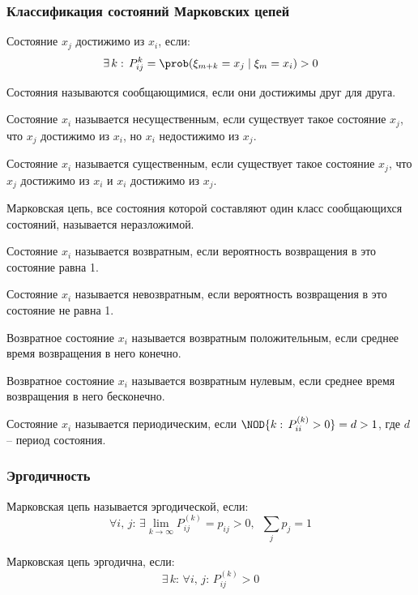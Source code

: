\documentclass[12pt]{article}
\begin{document}
\subsubsection{Классификация состояний Марковских цепей}
\begin{definition}
    Состояние $x_j$ достижимо из $x_i$, если:
    $$\exists\,k:\,P^k_{ij}=\prob(\xi_{m+k}=x_j\mid \xi_m=x_i)>0$$
\end{definition}
\begin{definition}
    Состояния называются сообщающимися, если они достижимы друг для друга.
\end{definition}
\begin{definition}
    Состояние $x_i$ называется несущественным, если существует такое состояние $x_j$, что $x_j$ достижимо из $x_i$, но $x_i$ недостижимо из $x_j$.
\end{definition}
\begin{definition}
    Состояние $x_i$ называется существенным, если существует такое состояние $x_j$, что $x_j$ достижимо из $x_i$ и $x_i$ достижимо из $x_j$.
\end{definition}
\begin{definition}
    Марковская цепь, все состояния которой составляют один класс сообщающихся состояний, называется неразложимой.
\end{definition}
\begin{definition}
    Состояние $x_i$ называется возвратным, если вероятность возвращения в это состояние равна 1.
\end{definition}
\begin{definition}
    Состояние $x_i$ называется невозвратным, если вероятность возвращения в это состояние не равна 1.
\end{definition}
\begin{definition}
    Возвратное состояние $x_i$ называется возвратным положительным, если среднее время возвращения в него конечно.
\end{definition}
\begin{definition}
    Возвратное состояние $x_i$ называется возвратным нулевым, если среднее время возвращения в него бесконечно.
\end{definition}
\begin{definition}
    Состояние $x_i$ называется периодическим, если $\NOD\{k:\,P^{(k)}_{ii}>0\}=d>1$, где $d$ -- период состояния.
\end{definition}
\subsubsection{Эргодичность}
\begin{definition}
    Марковская цепь называется эргодической, если:
    $$\forall i,\,j:\,\exists\lim_{k\to\infty}P^{(k)}_{ij}=p_{ij}>0,\enspace\sum_{j}p_j=1$$
\end{definition}
\begin{theorem}
    Марковская цепь эргодична, если:
    $$\exists\,k:\,\forall i,\,j:\,P^{(k)}_{ij}>0$$
\end{theorem}
\end{document}
